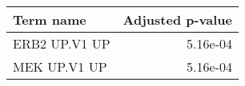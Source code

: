 \begin{tabular}{lr}
\toprule
    Term name &  Adjusted p-value \\
\midrule
ERB2 UP.V1 UP &          5.16e-04 \\
 MEK UP.V1 UP &          5.16e-04 \\
\bottomrule
\end{tabular}
